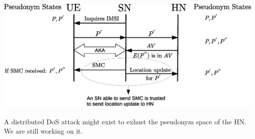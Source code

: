 \documentclass[portrait,a0]{a0poster}
\begin{document}
\begin{multicols}{2}
\begin{center}
\begin{minipage}[t]{0.9\linewidth} %
\vspace{.5cm} %
\includegraphics[width=1\linewidth]{solution.eps}
\hspace{0pt}
\vspace{.5cm} %
\end{minipage} 
\end{center}

A distributed DoS attack might exist to exhust the pseudonym space of the HN. We are still working on it.




\end{multicols}

\vfill %

\begin{minipage}[t]{0.9\linewidth} %
\footnotesize
{}
\end{minipage}
\end{document}

